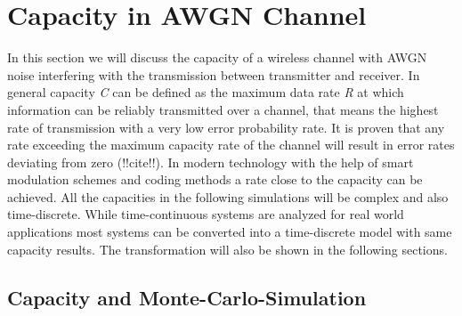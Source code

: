 \chapter{Capacity in AWGN Channel} \label{chap:awgnchan}
\graphicspath{{C:/Users/Kevin/Bachelarbeit/Bachelorarbeit/01_Bachelorarbeit_LaTex/02_Figures/}}

In this section we will discuss the capacity of a wireless channel with \gls{AWGN} noise interfering with the transmission between transmitter and receiver. 
\newline
In general capacity \textit{C} can be defined as the maximum data rate \textit{R} at which information can be reliably transmitted over a channel, that means the highest rate of transmission with a very low error probability rate. It is proven that any rate exceeding the maximum capacity rate of the channel will result in error rates deviating from zero (!!cite!!). In modern technology with the help of smart modulation schemes and coding methods a rate close to the capacity can be achieved. 
All the capacities in the following simulations will be complex and also time-discrete. While time-continuous systems are analyzed for real world applications most systems can be converted into a time-discrete model with same capacity results. The transformation will also be shown in the following sections. 
\section{Capacity and Monte-Carlo-Simulation}
\label{sec:capAWGN}

